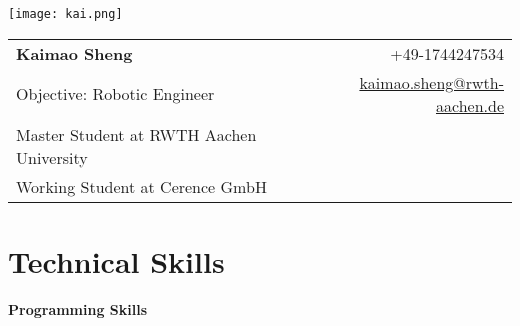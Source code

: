 \documentclass[a4paper,11pt]{article}
\makeatletter
\newcommand{\name}{Kaimao Sheng} %
\newcommand{\course}{Objective: Robotic Engineer} %
\newcommand{\phone}{1744247534} %
\newcommand{\emailb}{kaimao.sheng@rwth-aachen.de} %
\newcommand{\website}{https://www.linkedin.com/in/kaimao-sheng-806920176/} %
\makeatother
\begin{document}
\selectfont
\parbox{2.35cm}{%

\texttt{[image: kai.png]}

}\parbox{\dimexpr\linewidth-2.8cm\relax}{
\begin{tabularx}{\linewidth}{L r}
  \textbf{\LARGE \name} & +49-\phone\\
  
  \course &  \href{mailto:\emailb}{\emailb}\\
   {Master Student at RWTH Aachen University} &  \href{https://github.com/KaiYakexi}{\color{blue}{GitHub}} \\ %
  {Working Student at Cerence GmbH} & \href{https://www.linkedin.com/in/kaimao-sheng-806920176/}{\color{blue}{LinkedIn}}
\end{tabularx}
}
\vspace{-2mm}
\section{\textbf{Technical Skills}}

\textbf{Programming Skills}
\end{document}

